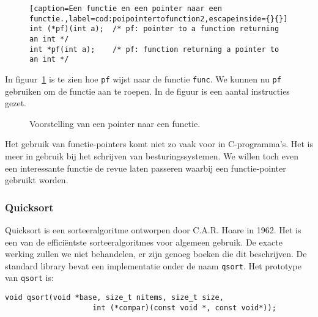 \begin{figure}[H]
\begin{lstlisting}[caption=Een functie en een pointer naar een functie.,label=cod:poipointertofunction2,escapeinside={}{}]
int (*pf)(int a);  /* pf: pointer to a function returning an int */
int *pf(int a);    /* pf: function returning a pointer to an int */
\end{lstlisting}
\end{figure}

In figuur~\ref{fig:poipointertofunction} is te zien hoe \texttt{pf} wijst naar de functie \texttt{func}. We kunnen nu \texttt{pf} gebruiken om de functie aan te roepen. In de figuur is een aantal instructies gezet.

\begin{figure}[!ht]
\centering
{}
\caption{Voorstelling van een pointer naar een functie.}
\label{fig:poipointertofunction}
\end{figure}

Het gebruik van functie-pointers komt niet zo vaak voor in C-programma's. Het is meer in gebruik bij het schrijven van besturingssystemen. We willen toch even een interessante functie de revue laten passeren waarbij een functie-pointer gebruikt worden.

\subsubsection*{Quicksort}
Quicksort is een sorteeralgoritme ontworpen door C.A.R. Hoare in 1962. Het is een van de efficiëntste sorteeralgoritmes voor algemeen gebruik. De exacte werking zullen we niet behandelen, er zijn genoeg boeken die dit beschrijven. De standard library bevat een implementatie onder de naam \texttt{qsort}. Het prototype van \texttt{qsort} is:


\hspace*{1em}\texttt{void qsort(void *base, size\_t nitems, size\_t size,}\\
\hspace*{1em}\texttt{\ \ \ \ \ \ \ \ \ \ \ \ \ \ \ \ \ \ \ \  int (*compar)(const void *, const void*));}

